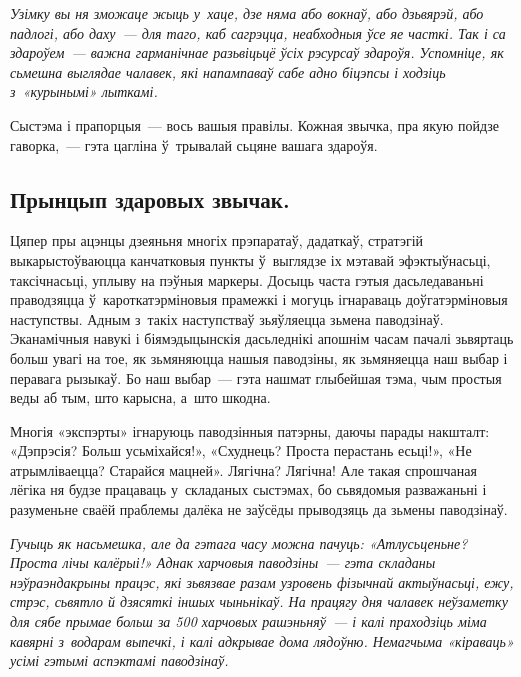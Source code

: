 \emph{Узімку вы ня зможаце жыць у~хаце, дзе няма або вокнаў, або дзьвярэй, або падлогі, або даху~--- для таго, каб сагрэцца, неабходныя ўсе яе часткі. Так і са здароўем~--- важна гарманічнае разьвіцьцё ўсіх рэсурсаў здароўя. Успомніце, як сьмешна выглядае чалавек, які напампаваў сабе адно біцэпсы і ходзіць з~«курынымі» лыткамі.}

Сыстэма і прапорцыя~--- вось вашыя правілы. Кожная звычка, пра якую пойдзе гаворка,~--- гэта цагліна ў~трывалай сьцяне вашага здароўя.

\subsection*{Прынцып здаровых звычак.}

Цяпер пры ацэнцы дзеяньня многіх прэпаратаў, дадаткаў, стратэгій выкарыстоўваюцца канчатковыя пункты ў~выглядзе іх мэтавай эфэктыўнасьці, таксічнасьці, уплыву на пэўныя маркеры. Досыць часта гэтыя дасьледаваньні праводзяцца ў~кароткатэрміновыя прамежкі і могуць ігнараваць доўгатэрміновыя наступствы. Адным з~такіх наступстваў зьяўляецца зьмена паводзінаў. Эканамічныя навукі і біямэдыцынскія дасьледнікі апошнім часам пачалі зьвяртаць больш увагі на тое, як зьмяняюцца нашыя паводзіны, як зьмяняецца наш выбар і перавага рызыкаў. Бо наш выбар~--- гэта нашмат глыбейшая тэма, чым простыя веды аб тым, што карысна, а~што шкодна.

Многія «экспэрты» ігнаруюць паводзінныя патэрны, даючы парады накшталт: «Дэпрэсія? Больш усьміхайся!», «Схуднець? Проста перастань есьці!», «Не атрымліваецца? Старайся мацней». Лягічна? Лягічна! Але такая спрошчаная лёгіка ня будзе працаваць у~складаных сыстэмах, бо сьвядомыя разважаньні і разуменьне сваёй праблемы далёка не заўсёды прыводзяць да зьмены паводзінаў.

\emph{Гучыць як насьмешка, але да гэтага часу можна пачуць: «Атлусьценьне? Проста лічы калёрыі!» Аднак харчовыя паводзіны~--- гэта складаны нэўраэндакрыны працэс, які зьвязвае разам узровень фізычнай актыўнасьці, ежу, стрэс, сьвятло й дзясяткі іншых чыньнікаў. На працягу дня чалавек неўзаметку для сябе прымае больш за 500 харчовых рашэньняў~--- і калі праходзіць міма кавярні з~водарам выпечкі, і калі адкрывае дома лядоўню. Немагчыма «кіраваць» усімі гэтымі аспэктамі паводзінаў.}


